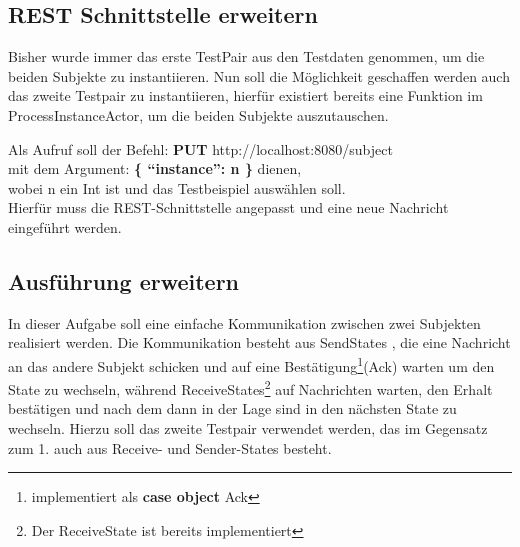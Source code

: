 \documentclass[11pt]{tudexercise}
\begin{document}
  \subsection{REST Schnittstelle erweitern}
    Bisher wurde immer das erste TestPair aus den Testdaten genommen, um die beiden Subjekte zu instantiieren.
    Nun soll die Möglichkeit geschaffen werden auch das zweite Testpair zu instantiieren,
    hierfür existiert bereits eine Funktion im ProcessInstanceActor,
    um die beiden Subjekte auszutauschen.

    Als Aufruf soll der Befehl:
    \textbf{PUT} http://localhost:8080/subject\\
    mit dem Argument: \textbf{\{ “instance”: n \}} dienen,\\
    wobei n ein Int ist und das Testbeispiel auswählen soll.\\
    Hierfür muss die REST-Schnittstelle angepasst und eine neue Nachricht eingeführt werden.

  \subsection{Ausführung erweitern}
    In dieser Aufgabe soll eine einfache Kommunikation zwischen zwei Subjekten realisiert werden.
    Die Kommunikation besteht aus SendStates , die eine Nachricht an das andere Subjekt schicken
    und auf eine Bestätigung\footnote{implementiert als \textbf{case object} Ack}(Ack) warten um den State zu wechseln,
    während ReceiveStates\footnote{Der ReceiveState ist bereits implementiert}
    auf Nachrichten warten, den Erhalt bestätigen und nach dem dann in der Lage sind
    in den nächsten State zu wechseln. Hierzu soll das zweite Testpair verwendet werden,
    das im Gegensatz zum 1. auch aus Receive- und Sender-States besteht.
\end{document}
